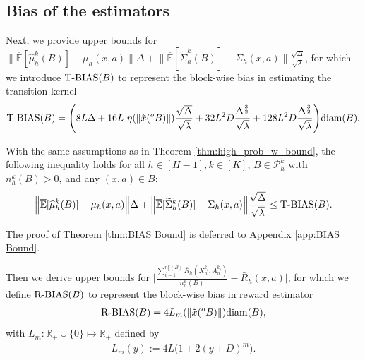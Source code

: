 \documentclass[final,supplement]{siamart251216}
\begin{document}
\subsection{Bias of the estimators}


Next, we provide upper bounds for $\Big\|\overline{\mathbb{E}}[\widehat{\mu}_{h}^{k}(B)]-\mu_{h}(x,a)\Big\|\Delta+\Big\|\overline{\mathbb{E}}[\widetilde{\Sigma}_{h}^{k}(B)]-\Sigma_h(x,a)\Big\|\frac{\sqrt{\Delta}}{\sqrt{\lambda}}$, for which we introduce $\mbox{\rm T-BIAS}(B)$ to represent the block-wise bias in estimating the transition kernel
\begin{eqnarray*}
    \mbox{\rm T-BIAS}(B) =\Bigg(8L\Delta+16L\,\,\eta(\|\tilde{x}(^{o}B)\|)\frac{\sqrt{\Delta}}{\sqrt{\lambda}} +32L^{2}D\frac{\Delta^{\frac{3}{2}}}{\sqrt{\lambda}}+128L^{2}D\frac{\Delta^{\frac{3}{2}}}{\sqrt{\lambda}}\Bigg){\rm diam}(B).
\end{eqnarray*}

\begin{theorem}\label{thm:BIAS Bound}
 With the same assumptions as in Theorem \ref{thm:high_prob_w_bound}, the following inequality holds for all $h\in [H-1],k\in [K]$, $B \in \mathcal{P}_h^k$ with $n_h^k(B)>0$, and any $(x,a) \in B$:
\begin{eqnarray}\label{eq:BIAS BOUND}
     \Big\|\overline{\mathbb{E}}[\widehat{\mu}_{h}^{k}(B)]-\mu_{h}(x,a)\Big\|\Delta+\Big\|\overline{\mathbb{E}}[\widetilde{\Sigma}_{h}^{k}(B)]-\Sigma_h(x,a)\Big\|\frac{\sqrt{\Delta}}{\sqrt{\lambda}} \leq \mbox{\rm T-BIAS}(B). 
\end{eqnarray}
\end{theorem}
The proof of Theorem \ref{thm:BIAS Bound} is deferred to Appendix \ref{app:BIAS Bound}.


Then we derive upper bounds for $\big|\frac{\sum_{i=1}^{n_h^k(B)}\bar{R}_{h}(X_{h}^{k_{i}},A_{h}^{k_{i}})}{n_h^k(B)}-\bar{R}_h(x,a)\big|$, for which we define $\mbox{\rm R-BIAS}(B)$ to represent the block-wise bias in reward estimator
\begin{eqnarray*}
    \mbox{\rm R-BIAS}(B)=4L_m(\|\tilde{x}(^{o}B)\|){\rm diam}(B),
\end{eqnarray*}
with $L_m: \mathbb{R}_+\cup\{0\}\mapsto \mathbb{R}_+$  defined by
\begin{eqnarray*}
L_m(y):=4L\Big(1+2(y+D)^m\Big).
\end{eqnarray*}
\end{document}
